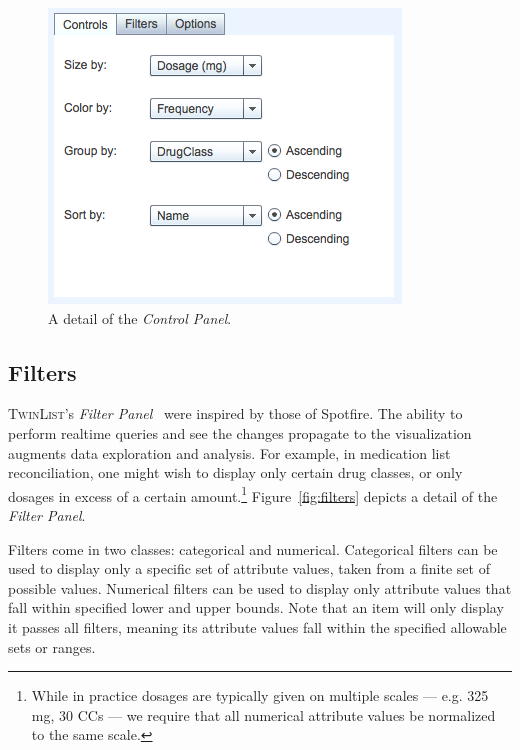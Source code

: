 \documentclass{chi2009}
\newcommand{\TwinList}{\textsc{TwinList}}
\newcommand{\Controls}{\textit{Control Panel}}
\newcommand{\Filters}{\textit{Filter Panel}}
\begin{document}
\begin{figure}
\begin{center}
\includegraphics[width=1\linewidth]{img/controls.png}
\end{center}
   \caption{A detail of the \Controls.}
   \label{fig:controls}
\end{figure}

\subsection{Filters}
\TwinList's \Filters~ were inspired by those of Spotfire\cite{Ahlberg1996}. The ability to perform realtime queries and see the changes propagate to the visualization augments data exploration and analysis. For example, in medication list reconciliation, one might wish to display only certain drug classes, or only dosages in excess of a certain amount.\footnote{While in practice dosages are typically given on multiple scales --- e.g. 325 mg, 30 CCs --- we require that all numerical attribute values be normalized to the same scale.} Figure~\ref{fig:filters} depicts a detail of the \Filters.

Filters come in two classes: categorical and numerical. Categorical filters can be used to display only a specific set of attribute values, taken from a finite set of possible values. Numerical filters can be used to display only attribute values that fall within specified lower and upper bounds. Note that an item will only display it passes all filters, meaning its attribute values fall within the specified allowable sets or ranges.
\end{document}
